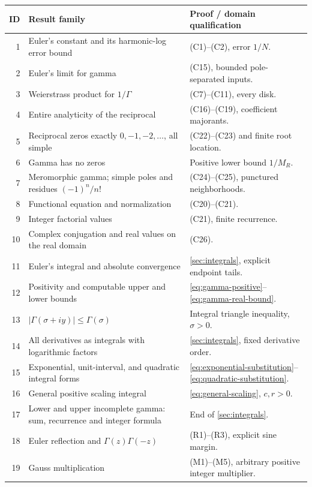 \small
\begin{longtable}{@{}r >{\raggedright\arraybackslash}p{}>{\raggedright\arraybackslash}p{}@{}}
\toprule
ID & Result family & Proof / domain qualification\\\midrule\endhead
1 & Euler's constant and its harmonic-log error bound & (C1)--(C2), error $1/N$.\\
2 & Euler's limit for gamma & (C15), bounded pole-separated inputs.\\
3 & Weierstrass product for $1/\Gamma$ & (C7)--(C11), every disk.\\
4 & Entire analyticity of the reciprocal & (C16)--(C19), coefficient majorants.\\
5 & Reciprocal zeros exactly $0,-1,-2,\ldots$, all simple & (C22)--(C23) and finite root location.\\
6 & Gamma has no zeros & Positive lower bound $1/M_R$.\\
7 & Meromorphic gamma; simple poles and residues $(-1)^n/n!$ & (C24)--(C25), punctured neighborhoods.\\
8 & Functional equation and normalization & (C20)--(C21).\\
9 & Integer factorial values & (C21), finite recurrence.\\
10 & Complex conjugation and real values on the real domain & (C26).\\
11 & Euler's integral and absolute convergence & \cref{sec:integrals}, explicit endpoint tails.\\
12 & Positivity and computable upper and lower bounds & \eqref{eq:gamma-positive}--\eqref{eq:gamma-real-bound}.\\
13 & $|\Gamma(\sigma+iy)|\le\Gamma(\sigma)$ & Integral triangle inequality, $\sigma>0$.\\
14 & All derivatives as integrals with logarithmic factors & \cref{sec:integrals}, fixed derivative order.\\
15 & Exponential, unit-interval, and quadratic integral forms & \eqref{eq:exponential-substitution}--\eqref{eq:quadratic-substitution}.\\
16 & General positive scaling integral & \eqref{eq:general-scaling}, $c,r>0$.\\
17 & Lower and upper incomplete gamma: sum, recurrence and integer formula & End of \cref{sec:integrals}.\\
18 & Euler reflection and $\Gamma(z)\Gamma(-z)$ & (R1)--(R3), explicit sine margin.\\
19 & Gauss multiplication & (M1)--(M5), arbitrary positive integer multiplier.\\

\end{longtable}
